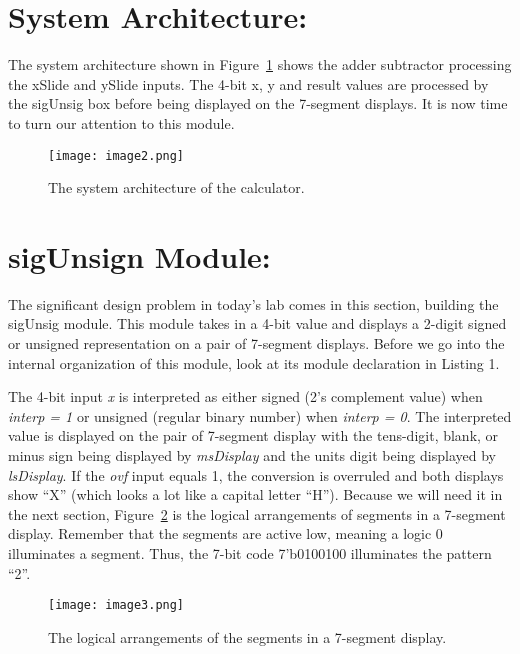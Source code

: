 \hypertarget{system-architecture}{%
\section{System Architecture:}\label{system-architecture}}

The system architecture shown in Figure~\ref{fig:sysArchCalc} shows the adder subtractor
processing the xSlide and ySlide inputs. The 4-bit x, y and result
values are processed by the sigUnsig box before being displayed on the
7-segment displays. It is now time to turn our attention to this module.

\begin{figure}
\texttt{[image:  image2.png]}
\caption{The system architecture of the calculator.}
\label{fig:sysArchCalc}
\end{figure}

\hypertarget{sigunsign-module}{%
\section{sigUnsign Module:}\label{sigunsign-module}}

The significant design problem in today's lab comes in this section,
building the sigUnsig module. This module takes in a 4-bit value and
displays a 2-digit signed or unsigned representation on a pair of
7-segment displays. Before we go into the internal organization of this
module, look at its module declaration in Listing 1.

The 4-bit input \emph{x} is interpreted as either signed (2's complement
value) when \emph{interp = 1} or unsigned (regular binary number) when
\emph{interp = 0}. The interpreted value is displayed on the pair of
7-segment display with the tens-digit, blank, or minus sign being
displayed by \emph{msDisplay} and the units digit being displayed by
\emph{lsDisplay}. If the \emph{ovf} input equals 1, the conversion is
overruled and both displays show ``X'' (which looks a lot like a capital
letter ``H''). Because we will need it in the next section, Figure~\ref{fig:calcSevenSeg} is
the logical arrangements of segments in a 7-segment display. Remember
that the segments are active low, meaning a logic 0 illuminates a
segment. Thus, the 7-bit code 7'b0100100 illuminates the pattern ``2''.

\begin{figure}
\texttt{[image:  image3.png]}
\caption{The logical arrangements of the segments in a 7-segment display.}
\label{fig:calcSevenSeg}
\end{figure}

